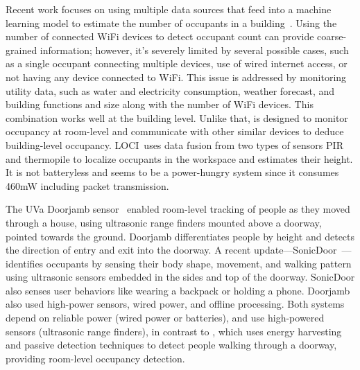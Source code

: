 Recent work focuses on using multiple data sources that feed into a machine learning model to estimate the number of occupants in a building~\cite{das2017non}. 
Using the number of connected WiFi devices to detect occupant count can provide coarse-grained information; however, it's severely limited by several possible cases, such as a single occupant connecting multiple devices, use of wired internet access, or not having any device connected to WiFi. This issue is addressed by monitoring utility data, such as water and electricity consumption, weather forecast, and building functions and size along with the number of WiFi devices. This combination works well at the building level. Unlike that, \sysname is designed to monitor occupancy at room-level and communicate with other similar devices to deduce building-level occupancy. 
LOCI~\cite{narayanaloci}uses data fusion from two types of sensors PIR and thermopile to localize occupants in the workspace and estimates their height. It is not batteryless and seems to be a power-hungry system since it consumes 460mW including packet transmission. 


The UVa Doorjamb sensor~\cite{hnat2012doorjamb} enabled room-level tracking of people as they moved through a house, using ultrasonic range finders mounted above a doorway, pointed towards the ground. Doorjamb differentiates people by height and detects the direction of entry and exit into the doorway. 
A recent update---SonicDoor~\cite{sonicdoor-buildsys2017}---identifies occupants by sensing their body shape, movement, and walking pattern using ultrasonic sensors embedded in the sides and top of the doorway. SonicDoor also senses user behaviors like wearing a backpack or holding a phone.
Doorjamb also used high-power sensors, wired power, and offline processing.
Both systems depend on reliable power (wired power or batteries), and use high-powered sensors (ultrasonic range finders), in contrast to \sysname, which uses energy harvesting and passive detection techniques to detect people walking through a doorway, providing room-level occupancy detection.

